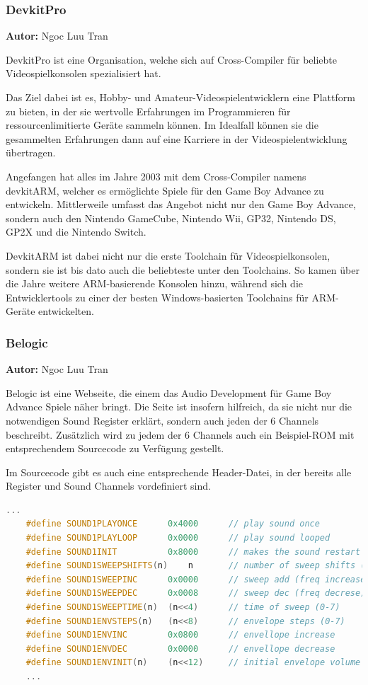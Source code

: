 \documentclass[11pt,a4paper]{scrartcl}
\newcommand{\AutorNgoc} {
    \vspace{-4mm}
    \large \textbf{Autor:} Ngoc Luu Tran \normalsize
    \vspace{2mm}
}
\begin{document}

\subsubsection{DevkitPro}
\AutorNgoc

DevkitPro ist eine Organisation, welche sich auf Cross-Compiler f\"ur beliebte Videospielkonsolen spezialisiert hat.

Das Ziel dabei ist es, Hobby- und Amateur-Videospielentwicklern eine Plattform zu bieten, in der sie wertvolle Erfahrungen im Programmieren f\"ur ressourcenlimitierte Ger\"ate sammeln k\"onnen. Im Idealfall k\"onnen sie die gesammelten Erfahrungen dann auf eine Karriere in der Videospielentwicklung \"ubertragen.

Angefangen hat alles im Jahre 2003 mit dem Cross-Compiler namens devkitARM, welcher es erm\"oglichte Spiele f\"ur den Game Boy Advance zu entwickeln. Mittlerweile umfasst das Angebot nicht nur den Game Boy Advance, sondern auch den Nintendo GameCube, Nintendo Wii, GP32, Nintendo DS, GP2X und die Nintendo Switch. 

DevkitARM ist dabei nicht nur die erste Toolchain f\"ur Videospielkonsolen, sondern sie ist bis dato auch die beliebteste unter den Toolchains. So kamen \"uber die Jahre weitere ARM-basierende Konsolen hinzu, w\"ahrend sich die Entwicklertools zu einer der besten Windows-basierten Toolchains f\"ur ARM-Ger\"ate entwickelten. 


\subsubsection{Belogic}
\AutorNgoc
 
Belogic ist eine Webseite, die einem das Audio Development f\"ur Game Boy Advance Spiele n\"aher bringt. Die Seite ist insofern hilfreich, da sie nicht nur die notwendigen Sound Register erkl\"art, sondern auch jeden der 6 Channels beschreibt. Zus\"atzlich wird zu jedem der 6 Channels auch ein Beispiel-ROM mit entsprechendem Sourcecode zu Verf\"ugung gestellt.

Im Sourcecode gibt es auch eine entsprechende Header-Datei, in der bereits alle Register und Sound Channels vordefiniert sind.

\vspace{5mm}
\begin{lstlisting}[language=C++, caption={1. Ausschnitt aus Belogic gba.h}, label={list:gbaheader2}]
    ...
	#define SOUND1PLAYONCE		0x4000		// play sound once
	#define SOUND1PLAYLOOP		0x0000		// play sound looped
	#define SOUND1INIT			0x8000		// makes the sound restart
	#define SOUND1SWEEPSHIFTS(n)	n		// number of sweep shifts (0-7)
	#define SOUND1SWEEPINC		0x0000		// sweep add (freq increase)
	#define SOUND1SWEEPDEC		0x0008		// sweep dec (freq decrese)
	#define SOUND1SWEEPTIME(n)	(n<<4)		// time of sweep (0-7)
	#define SOUND1ENVSTEPS(n)	(n<<8)		// envelope steps (0-7)
	#define SOUND1ENVINC		0x0800		// envellope increase
	#define SOUND1ENVDEC		0x0000		// envellope decrease
	#define SOUND1ENVINIT(n)	(n<<12)		// initial envelope volume (0-15)
	...
\end{lstlisting}
\end{document}
